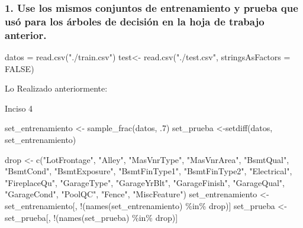\documentclass[
]{article}
\newenvironment{Shaded}{\begin{snugshade}}{\end{snugshade}}
\newcommand{\AttributeTok}[1]{\textcolor[rgb]{0.77,0.63,0.00}{#1}}
\newcommand{\ConstantTok}[1]{\textcolor[rgb]{0.00,0.00,0.00}{#1}}
\newcommand{\DecValTok}[1]{\textcolor[rgb]{0.00,0.00,0.81}{#1}}
\newcommand{\FunctionTok}[1]{\textcolor[rgb]{0.00,0.00,0.00}{#1}}
\newcommand{\NormalTok}[1]{#1}
\newcommand{\OtherTok}[1]{\textcolor[rgb]{0.56,0.35,0.01}{#1}}
\newcommand{\SpecialCharTok}[1]{\textcolor[rgb]{0.00,0.00,0.00}{#1}}
\newcommand{\StringTok}[1]{\textcolor[rgb]{0.31,0.60,0.02}{#1}}
\begin{document}
\hypertarget{use-los-mismos-conjuntos-de-entrenamiento-y-prueba-que-usuxf3-para-los-uxe1rboles-de-decisiuxf3n-en-la-hoja-de-trabajo-anterior.}{%
\subsubsection{1. Use los mismos conjuntos de entrenamiento y prueba que
usó para los árboles de decisión en la hoja de trabajo
anterior.}\label{use-los-mismos-conjuntos-de-entrenamiento-y-prueba-que-usuxf3-para-los-uxe1rboles-de-decisiuxf3n-en-la-hoja-de-trabajo-anterior.}}

\begin{Shaded}
\begin{Highlighting}[]
\NormalTok{datos }\OtherTok{=} \FunctionTok{read.csv}\NormalTok{(}\StringTok{"./train.csv"}\NormalTok{)}
\NormalTok{test}\OtherTok{\textless{}{-}} \FunctionTok{read.csv}\NormalTok{(}\StringTok{"./test.csv"}\NormalTok{, }\AttributeTok{stringsAsFactors =} \ConstantTok{FALSE}\NormalTok{)}
\end{Highlighting}
\end{Shaded}

Lo Realizado anteriormente:

Inciso 4

\begin{Shaded}
\begin{Highlighting}[]
\NormalTok{set\_entrenamiento }\OtherTok{\textless{}{-}} \FunctionTok{sample\_frac}\NormalTok{(datos, .}\DecValTok{7}\NormalTok{)}
\NormalTok{set\_prueba }\OtherTok{\textless{}{-}}\FunctionTok{setdiff}\NormalTok{(datos, set\_entrenamiento)}


\NormalTok{drop }\OtherTok{\textless{}{-}} \FunctionTok{c}\NormalTok{(}\StringTok{"LotFrontage"}\NormalTok{, }\StringTok{"Alley"}\NormalTok{, }\StringTok{"MasVnrType"}\NormalTok{, }\StringTok{"MasVnrArea"}\NormalTok{, }\StringTok{"BsmtQual"}\NormalTok{, }\StringTok{"BsmtCond"}\NormalTok{, }\StringTok{"BsmtExposure"}\NormalTok{, }\StringTok{"BsmtFinType1"}\NormalTok{, }\StringTok{"BsmtFinType2"}\NormalTok{, }\StringTok{"Electrical"}\NormalTok{, }\StringTok{"FireplaceQu"}\NormalTok{, }\StringTok{"GarageType"}\NormalTok{, }\StringTok{"GarageYrBlt"}\NormalTok{, }\StringTok{"GarageFinish"}\NormalTok{, }\StringTok{"GarageQual"}\NormalTok{, }\StringTok{"GarageCond"}\NormalTok{, }\StringTok{"PoolQC"}\NormalTok{, }\StringTok{"Fence"}\NormalTok{, }\StringTok{"MiscFeature"}\NormalTok{)}
\NormalTok{set\_entrenamiento }\OtherTok{\textless{}{-}}\NormalTok{ set\_entrenamiento[, }\SpecialCharTok{!}\NormalTok{(}\FunctionTok{names}\NormalTok{(set\_entrenamiento) }\SpecialCharTok{\%in\%}\NormalTok{ drop)]}
\NormalTok{set\_prueba }\OtherTok{\textless{}{-}}\NormalTok{ set\_prueba[, }\SpecialCharTok{!}\NormalTok{(}\FunctionTok{names}\NormalTok{(set\_prueba) }\SpecialCharTok{\%in\%}\NormalTok{ drop)]}
\end{Highlighting}
\end{Shaded}
\end{document}
